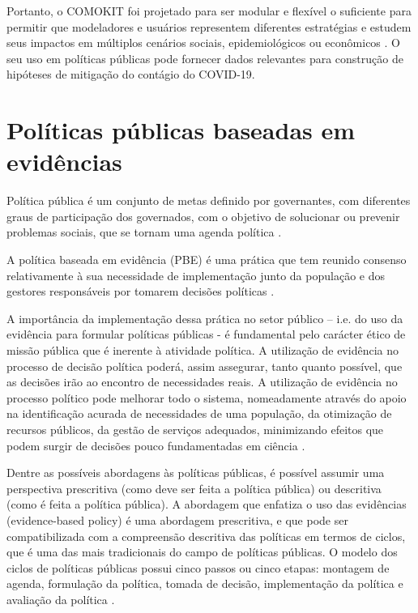 Portanto, o COMOKIT foi projetado para ser modular e flexível o suficiente para permitir que modeladores e usuários representem diferentes estratégias e estudem seus impactos em múltiplos cenários sociais, epidemiológicos ou econômicos \cite{ArtigoComokit:online}. O seu uso em políticas públicas pode fornecer dados relevantes para construção de hipóteses de mitigação do contágio do COVID-19.


\section{Políticas públicas baseadas em evidências}

Política pública é um conjunto de metas definido por governantes, com diferentes graus de participação dos governados, com o objetivo de solucionar ou prevenir problemas sociais, que se tornam uma agenda política \cite{estrategicasciencia}.

A política baseada em evidência (PBE) é uma prática que tem reunido consenso relativamente à sua necessidade de implementação junto da população e dos gestores responsáveis por tomarem decisões políticas \cite{ramos2018}.

A importância da implementação dessa prática no setor público – i.e. do uso da evidência para formular políticas públicas - é fundamental pelo carácter ético de missão pública que é inerente à atividade política. A utilização de evidência no processo de decisão política poderá, assim assegurar, tanto quanto possível, que as decisões irão ao encontro de necessidades reais. A utilização de evidência no processo político pode melhorar todo o sistema, nomeadamente através do apoio na identificação acurada de necessidades de uma população, da otimização de recursos públicos, da gestão de serviços adequados, minimizando efeitos que podem surgir de decisões pouco fundamentadas em ciência \cite{santos2020ciencia}.

Dentre as possíveis abordagens às políticas públicas, é possível assumir uma perspectiva prescritiva (como deve ser feita a política pública) ou descritiva (como é feita a política pública). A abordagem que enfatiza o uso das evidências (evidence-based policy) é uma abordagem prescritiva, e que pode ser compatibilizada com a compreensão descritiva das políticas em termos de ciclos, que é uma das mais tradicionais do campo de políticas públicas. O modelo dos ciclos de políticas públicas possui cinco passos ou cinco etapas: montagem de agenda, formulação da política, tomada de decisão, implementação da política e avaliação da política \cite{de2018politicas}.

